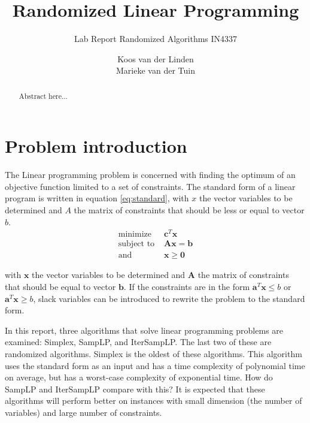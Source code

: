 \documentclass[nocopyrightspace]{acm_proc_article-sp}
\begin{document}
\title{Randomized Linear Programming}
\subtitle{Lab Report Randomized Algorithms IN4337}
\author{
\alignauthor
Koos van der Linden \\ 
\alignauthor
Marieke van der Tuin \\ 
}
\maketitle
\begin{abstract}
Abstract here...
\end{abstract}

\section{Problem introduction}
The Linear programming problem is concerned with finding the optimum of an objective function limited to a set of constraints. The standard form of a linear program is written in equation \ref{eq:standard}, with $x$ the vector variables to be determined and $A$ the matrix of constraints that should be less or equal to vector $b$.
\begin{equation}
\label{eq:standard}
\begin{split}
\text{minimize } & \mathbf{c}^T \mathbf{x} \\
\text{subject to } &  \mathbf{Ax} = \mathbf{b} \\
\text{and } & \mathbf{x} \geq \mathbf{0}
\end{split}
\end{equation}

with $\mathbf{x}$ the vector variables to be determined and $\mathbf{A}$ the matrix of constraints that should be equal to vector $\mathbf{b}$. If the constraints are in the form $\mathbf{a}^T \mathbf{x} \leq b$ or $\mathbf{a}^T \mathbf{x} \geq b$, slack variables can be introduced to rewrite the problem to the standard form. 

In this report, three algorithms that solve linear programming problems are examined: Simplex, SampLP, and IterSampLP. The last two of these are randomized algorithms. Simplex is the oldest of these algorithms. This algorithm uses the standard form as an input and has a time complexity of polynomial time on average, but has a worst-case complexity of exponential time. How do SampLP and IterSampLP compare with this? It is expected that these algorithms will perform better on instances with small dimension (the number of variables) and large number of constraints. 
\end{document}
